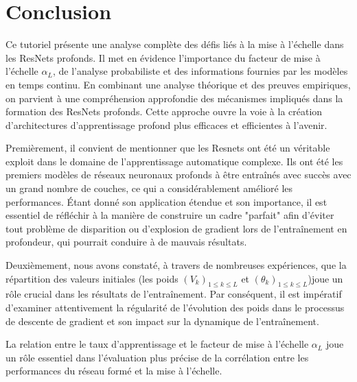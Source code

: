 \chapter{Conclusion}
Ce tutoriel présente une analyse complète des défis liés à la mise à l'échelle dans les ResNets profonds. Il met en évidence l'importance du facteur de mise à l'échelle \(\alpha_L\), de l'analyse probabiliste et des informations fournies par les modèles en temps continu. En combinant une analyse théorique et des preuves empiriques, on parvient à une compréhension approfondie des mécanismes impliqués dans la formation des ResNets profonds. Cette approche ouvre la voie à la création d'architectures d'apprentissage profond plus efficaces et efficientes à l'avenir.

Premièrement, il convient de mentionner que les Resnets ont été un véritable exploit dans le domaine de l'apprentissage automatique complexe. Ils ont été les premiers modèles de réseaux neuronaux profonds à être entraînés avec succès avec un grand nombre de couches, ce qui a considérablement amélioré les performances. Étant donné son application étendue et son importance, il est essentiel de réfléchir à la manière de construire un cadre "parfait" afin d'éviter tout problème de disparition ou d'explosion de gradient lors de l'entraînement en profondeur, qui pourrait conduire à de mauvais résultats.

Deuxièmement, nous avons constaté, à travers de nombreuses expériences, que la répartition des valeurs initiales (les poids $(V_k)_{1\leqslant k \leqslant L }$ et $(\theta_k)_{1\leqslant k \leqslant L }$)joue un rôle crucial dans les résultats de l'entraînement. Par conséquent, il est impératif d'examiner attentivement la régularité de l'évolution des poids dans le processus de descente de gradient et son impact sur la dynamique de l'entraînement.

La relation entre le taux d'apprentissage et le facteur de mise à l'échelle $\alpha_{L}$ joue un rôle essentiel dans l'évaluation plus précise de la corrélation entre les performances du réseau formé et la mise à l'échelle.